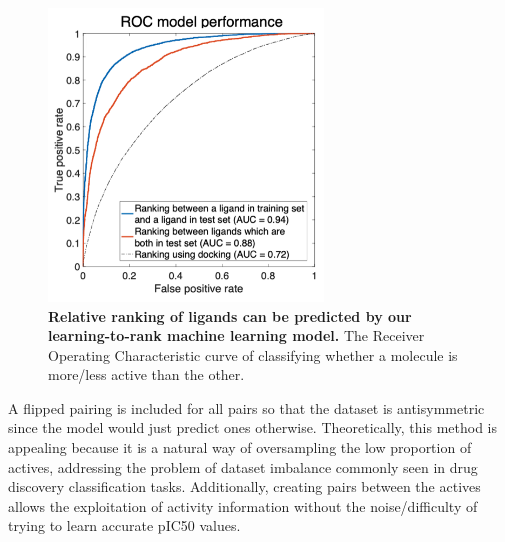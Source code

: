 \begin{figure}[!th]
 \centering
 \includegraphics[width=0.65\textwidth]{Chapters/Ranking/Figs/roc_curve.png}
 \caption{\textbf{Relative ranking of ligands can be predicted by our learning-to-rank machine learning model.} The Receiver Operating Characteristic curve of classifying whether a molecule is more/less active than the other.}
 \label{fig:roc_plot}
\end{figure}

A flipped pairing is included for all pairs so that the dataset is antisymmetric since the model would just predict ones otherwise. Theoretically, this method is appealing because it is a natural way of oversampling the low proportion of actives, addressing the problem of dataset imbalance commonly seen in drug discovery classification tasks. Additionally, creating pairs between the actives allows the exploitation of activity information without the noise/difficulty of trying to learn accurate pIC50 values.


